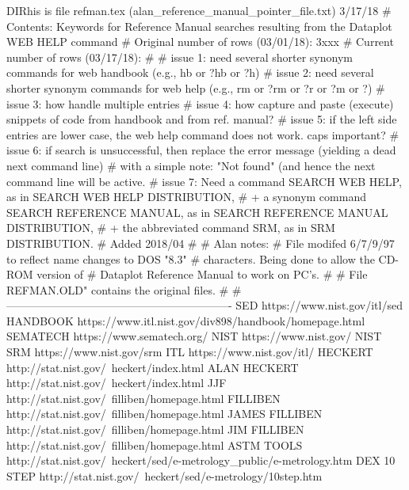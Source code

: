 DIRhis is file refman.tex   (alan_reference_manual_pointer_file.txt)   3/17/18
# Contents: Keywords for Reference Manual searches resulting from the Dataplot     WEB HELP     command
# Original number of rows (03/01/18): 3xxx
# Current  number of rows (03/17/18):
#
# issue 1: need several shorter synonym commands for    web handbook (e.g., hb or ?hb or ?h)
# issue 2: need several shorter synonym commands for    web help     (e.g., rm or ?rm or ?r or ?m or ?)
# issue 3: how handle multiple entries
# issue 4: how capture and paste (execute) snippets of code from handbook and from ref. manual?
# issue 5: if the left side entries are lower case, the web help command does not work.  caps important?
# issue 6: if search is unsuccessful, then replace the error message (yielding a dead next command line)
#          with a simple note: "Not found" (and hence the next command line will be active.
# issue 7: Need a command             SEARCH WEB HELP,         as in SEARCH WEB HELP DISTRIBUTION,
#          + a synonym command        SEARCH REFERENCE MANUAL, as in SEARCH REFERENCE MANUAL DISTRIBUTION,
#          + the abbreviated command  SRM,                     as in SRM DISTRIBUTION.
#          Added 2018/04
#
# Alan notes:
#    File modifed 6/7/9/97 to reflect name changes to DOS "8.3"
#    characters.  Being done to allow the CD-ROM version of
#    Dataplot Reference Manual to work on PC's.
#
#    File REFMAN.OLD" contains the original files.
#
# -------------------------------------------------------------
SED                                     https://www.nist.gov/itl/sed
HANDBOOK                                https://www.itl.nist.gov/div898/handbook/homepage.html
SEMATECH                                https://www.sematech.org/
NIST                                    https://www.nist.gov/
NIST SRM                                https://www.nist.gov/srm
ITL                                     https://www.nist.gov/itl/
HECKERT                                 http://stat.nist.gov/~heckert/index.html
ALAN HECKERT                            http://stat.nist.gov/~heckert/index.html
JJF                                     http://stat.nist.gov/~filliben/homepage.html
FILLIBEN                                http://stat.nist.gov/~filliben/homepage.html
JAMES FILLIBEN                          http://stat.nist.gov/~filliben/homepage.html
JIM FILLIBEN                            http://stat.nist.gov/~filliben/homepage.html
ASTM TOOLS                              http://stat.nist.gov/~heckert/sed/e-metrology_public/e-metrology.htm
DEX 10 STEP                             http://stat.nist.gov/~heckert/sed/e-metrology/10step.htm
